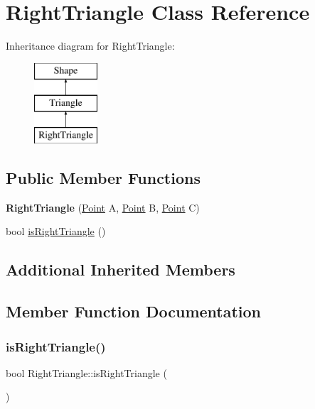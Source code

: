 \hypertarget{class_right_triangle}{}\section{Right\+Triangle Class Reference}
\label{class_right_triangle}
Inheritance diagram for Right\+Triangle\+:\begin{figure}[H]
\begin{center}
\leavevmode
\includegraphics[height=3.000000cm]{class_right_triangle}
\end{center}
\end{figure}
\subsection*{Public Member Functions}
\begin{DoxyCompactItemize}
\item 
\mbox{\label{class_right_triangle_a532534df65aeabb7af675f87086db6bc}} 
{\bfseries Right\+Triangle} (\mbox{\hyperlink{class_point}{Point}} A, \mbox{\hyperlink{class_point}{Point}} B, \mbox{\hyperlink{class_point}{Point}} C)
\item 
bool \mbox{\hyperlink{class_right_triangle_a5dc1d7509c3909221b1902f6a6ebc2c4}{is\+Right\+Triangle}} ()
\end{DoxyCompactItemize}
\subsection*{Additional Inherited Members}


\subsection{Member Function Documentation}
\mbox{\label{class_right_triangle_a5dc1d7509c3909221b1902f6a6ebc2c4}} 
\subsubsection{\texorpdfstring{is\+Right\+Triangle()}{isRightTriangle()}}
{\footnotesize\ttfamily bool Right\+Triangle\+::is\+Right\+Triangle (\begin{DoxyParamCaption}{ }\end{DoxyParamCaption})}

